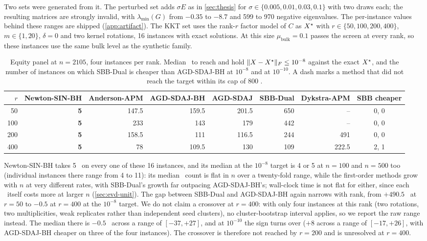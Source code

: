 Two sets were generated from it. The perturbed set adds
$\sigma E$ as in \cref{sec:thesis} for $\sigma\in\{0.005,0.01,0.03,0.1\}$ with
two draws each; the resulting matrices are strongly invalid, with
$\lambda_{\min}(G)$ from $-0.35$ to $-8.7$ and 599 to 970 negative eigenvalues.
The per-instance values behind these ranges are shipped
(\cref{app:artifact}).
The KKT set uses the rank-$r$ factor model of $C$ as $X^\star$ with
$r\in\{50,100,200,400\}$, $m\in\{1,20\}$, $\delta=0$ and two kernel rotations,
16 instances with exact solutions. At this size $\mu_{\mathrm{bulk}}=0.1$
passes the screen at every rank, so these instances use the same bulk level as
the synthetic family.

\begin{table}[t]
\centering
\caption{Equity panel at $n=2105$, four instances per rank. Median \EVDs\ to
reach and hold $\lVert X-X^\star\rVert_F\le10^{-8}$ against the exact $X^\star$, and the number
of instances on which SBB-Dual is cheaper than AGD-SDAJ-BH at $10^{-8}$ and at
$10^{-10}$. A dash marks a method that did not reach the target within its cap
of 800 \EVDs.}
\label{tab:us2105}
\footnotesize
\setlength{\tabcolsep}{3pt}
\begin{tabular}{rrrrrrrc}
\toprule
$r$ & Newton-SIN-BH & Anderson-APM & AGD-SDAJ-BH & AGD-SDAJ & SBB-Dual & Dykstra-APM & SBB cheaper\\
\midrule
50  & \textbf{5} & 147.5 & 159.5 & 201.5 & 650 & -- & 0, 0\\
100 & \textbf{5} & 233   & 143   & 179   & 442 & -- & 0, 0\\
200 & \textbf{5} & 158.5 & 111   & 116.5 & 244 & 491 & 0, 0\\
400 & \textbf{5} & 78    & 109.5 & 130   & 109 & 222.5 & 2, 1\\
\bottomrule
\end{tabular}
\end{table}

Newton-SIN-BH takes 5 \EVDs\ on every one of these 16 instances, and its
median at the $10^{-8}$ target is 4 or 5 at $n=100$ and $n=500$ too
(individual instances there range from 4 to 11): its median \EVD\ count is
flat in $n$ over a twenty-fold range, while the first-order methods grow
with $n$ at very different rates, with SBB-Dual's growth far outpacing
AGD-SDAJ-BH's; wall-clock time is not flat for either, since
each \EVD\ itself costs more at larger $n$ (\cref{sec:evd-unit}). The gap between
SBB-Dual and
AGD-SDAJ-BH again narrows with rank, from $+490.5$ \EVDs\ at $r=50$ to $-0.5$ at
$r=400$ at the $10^{-8}$ target. We do not claim a crossover at $r=400$: with
only four instances at this rank (two rotations, two multiplicities, weak
replicates rather than independent seed clusters), no cluster-bootstrap
interval applies, so we report the raw range instead. The median there is
$-0.5$ \EVDs\ across a range of $[-37,+27]$, and at
$10^{-10}$ the sign turns over ($+8$ across a range of $[-17,+26]$, with
AGD-SDAJ-BH cheaper on three of the four instances). The crossover is
therefore not reached by $r=200$ and is unresolved at $r=400$.

